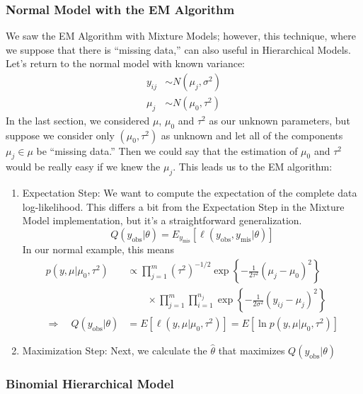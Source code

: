 \documentclass[12pt]{article}
\theoremstyle{plain}
\theoremstyle{definition}
\theoremstyle{remark}
\begin{document}
\newpage
\subsubsection{Normal Model with the EM Algorithm}

We saw the EM Algorithm with Mixture Models; however, this technique,
where we suppose that there is ``missing data,''
can also useful in Hierarchical Models.  Let's return to the normal
model with known variance:
\begin{align*}
   y_{ij} &\sim N(\mu_j, \sigma^2) \\
   \mu_j &\sim N(\mu_0, \tau^2)
\end{align*}
In the last section, we considered $\mu$, $\mu_0$ and $\tau^2$ as our
unknown parameters, but suppose we consider only $(\mu_0, \tau^2)$ as
unknown and let all of the components $\mu_j \in \mu$ be ``missing
data.'' Then we could say that the estimation of $\mu_0$ and $\tau^2$
would be really easy if we knew the $\mu_j$. This leads us to the
EM algorithm:
\begin{enumerate}
   \item Expectation Step: We want to compute the expectation of the
      complete data log-likelihood. This differs a bit from the
      Expectation Step in the Mixture Model implementation, but
      it's a straightforward generalization.
      \[ Q(y_{\text{obs}} | \theta) = E_{y_\text{mis}}\left[
	 \ell(y_{\text{obs}}, y_{\text{mis}} | \theta) \right]\]
      In our normal example, this means
      \begin{align*}
	 p(y, \mu | \mu_0, \tau^2) &\propto \prod^m_{j=1}
	    (\tau^2)^{-1/2} \exp\left\{-\frac{1}{2\tau^2}
	    (\mu_j - \mu_0)^2\right\} \\
	    &\qquad \times \prod^m_{j=1} \prod^{n_j}_{i=1}
	    \exp\left\{ -\frac{1}{2\sigma^2}(y_{ij}-\mu_j)^2\right\} \\
	 \Rightarrow \quad Q(y_{\text{obs}}|\theta)
	    &= E[\ell(y,\mu|\mu_0, \tau^2)] = E[\ln
	    p(y, \mu | \mu_0, \tau^2)]
      \end{align*}
   \item Maximization Step: Next, we calculate the $\hat{\theta}$
      that maximizes $Q(y_{\text{obs}}|\theta)$
\end{enumerate}

\newpage
\subsubsection{Binomial Hierarchical Model}
\end{document}
